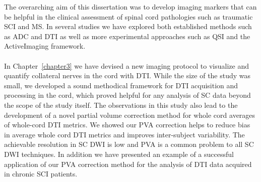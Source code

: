 The overarching aim of this dissertation was to develop imaging markers that can be helpful in the clinical assessment of spinal cord pathologies such as traumatic \gls{SCI} and \gls{MS}. In several studies we have explored both established methods such as \gls{ADC} and \gls{DTI} as well as more experimental approaches such as \gls{QSI} and the ActiveImaging framework.
\paragraph{}
In Chapter~\ref{chapter3} we have devised a new imaging protocol to visualize and quantify collateral nerves in the cord with \gls{DTI}. While the size of the study was small, we developed a sound methodical framework for \gls{DTI} acquisition and processing in the cord, which proved helpful for any analysis of \gls{SC} data beyond the scope of the study itself. The observations in this study also lead to the development of a novel partial volume correction method for whole cord averages of whole-cord {\gls{DTI}} metrics. We showed our PVA correction helps to reduce bias in average whole cord \gls{DTI} metrics and improves inter-subject variability. The achievable resolution in {\gls{SC}} DWI is low and PVA is a common problem to all {\gls{SC}} DWI techniques. In addition we have presented an example of a successful application of our \gls{PVA} correction method for the analysis of \gls{DTI} data acquired in chronic \gls{SCI} patients. 
